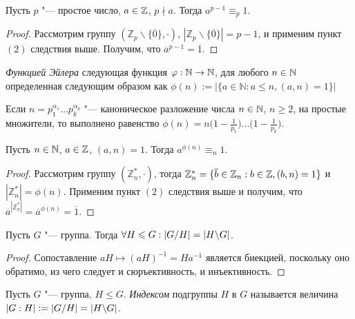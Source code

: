 \begin{corollary}
	Пусть $p$ "--- простое число, $a \in \mathbb{Z}$, $p \nmid a$. Тогда $a^{p-1} \equiv_p 1$.
\end{corollary}

\begin{proof}
	Рассмотрим группу $(\mathbb{Z}_p\backslash\{\overline{0}\}, \cdot)$, $|\mathbb{Z}_p\backslash\{\overline{0}\}| = p - 1$, и применим пункт $(2)$ следствия выше. Получим, что $\overline{a}^{p - 1} = \overline{1}$.
\end{proof}

\begin{definition}
	\textit{Функцией Эйлера} следующая функция $\varphi: \mathbb{N} \to \mathbb{N}$, для любого $n \in \mathbb{N}$ определенная следующим образом как $\phi(n) := \left|\{a \in \mathbb{N}: a \le n, (a, n) = 1\}\right|$
\end{definition}

\begin{note}
	Если $n = p_1^{\alpha_1}\dots p_k^{\alpha_k}$ "--- каноническое разложение числа $n \in \mathbb{N}$, $n \ge 2$, на простые множители, то выполнено равенство $\phi(n) = n\big(1 - \frac{1}{p_1}\big)\dots\big(1 - \frac{1}{p_k}\big)$.
\end{note}

\begin{theorem}[Эйлера]
	Пусть $n \in \mathbb{N}$, $a \in \mathbb{Z}$, $(a, n) = 1$. Тогда $a^{\phi(n)} \equiv_n 1$.
\end{theorem}

\begin{proof}
	Рассмотрим группу $(\mathbb{Z}_n^*, \cdot)$, тогда $\mathbb{Z}_n^* = \{\overline{b} \in \mathbb{Z}_n: b \in \mathbb{Z}, (b, n) = 1\}$ и $|\mathbb{Z}_n^*| = \phi(n)$. Применим пункт $(2)$ следствия выше и получим, что $\overline{a}^{|\mathbb{Z}_n^*|} = \overline{a}^{\phi(n)} = \overline{1}$.
\end{proof}

\begin{proposition}
	Пусть $G$ "--- группа. Тогда $\forall H \le G: |G / H| \hm= |H \bs G|$.
\end{proposition}

\begin{proof}
	Сопоставление $aH \mapsto (aH)^{-1} = Ha^{-1}$ является биекцией, поскольку оно обратимо, из чего следует и сюръективность, и инъективность.
\end{proof}

\begin{definition}
	Пусть $G$ "--- группа, $H \le G$. \textit{Индексом} подгруппы $H$ в $G$ называется величина $|G : H| := |G / H| = |H \backslash G|$.
\end{definition}